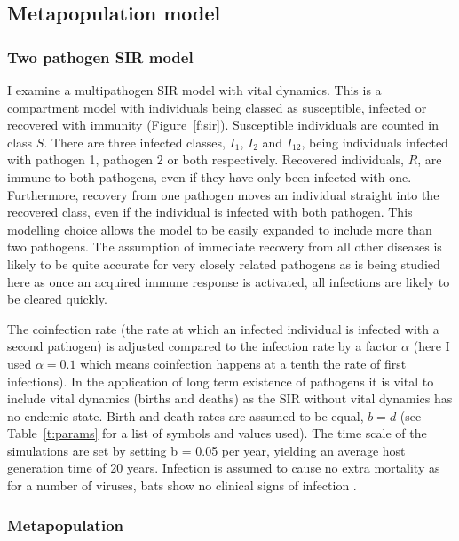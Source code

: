 \subsection{Metapopulation model}




\subsubsection{Two pathogen SIR model}

I examine a multipathogen SIR model with vital dynamics. 
This is a compartment model with individuals being classed as susceptible, infected or recovered with immunity (Figure~\ref{f:sir}).
Susceptible individuals are counted in class $S$.
There are three infected classes, $I_1$, $I_2$ and $I_{12}$, being individuals infected with pathogen 1, pathogen 2 or both respectively.
Recovered individuals, $R$, are immune to both pathogens, even if they have only been infected with one.
Furthermore, recovery from one pathogen moves an individual straight into the recovered class, even if the individual is infected with both pathogen.
This modelling choice allows the model to be easily expanded to include more than two pathogens.
The assumption of immediate recovery from all other diseases is likely to be quite accurate for very closely related pathogens as is being studied here as once an acquired immune response is activated, all infections are likely to be cleared quickly.

The coinfection rate (the rate at which an infected individual is infected with a second pathogen) is adjusted compared to the infection rate by a factor $\alpha$ (here I used $\alpha = 0.1$ which means coinfection happens at a tenth the rate of first infections).
In the application of long term existence of pathogens it is vital to include vital dynamics (births and deaths) as the SIR without vital dynamics has no endemic state.
Birth and death rates are assumed to be equal, $b = d$ (see Table~\ref{t:params} for a list of symbols and values used).
The time scale of the simulations are set by setting b = 0.05 per year, yielding an average host generation time of 20 years.
Infection is assumed to cause no extra mortality as for a number of viruses, bats show no clinical signs of infection \cite{halpin2011pteropid}.


\subsubsection{Metapopulation}


